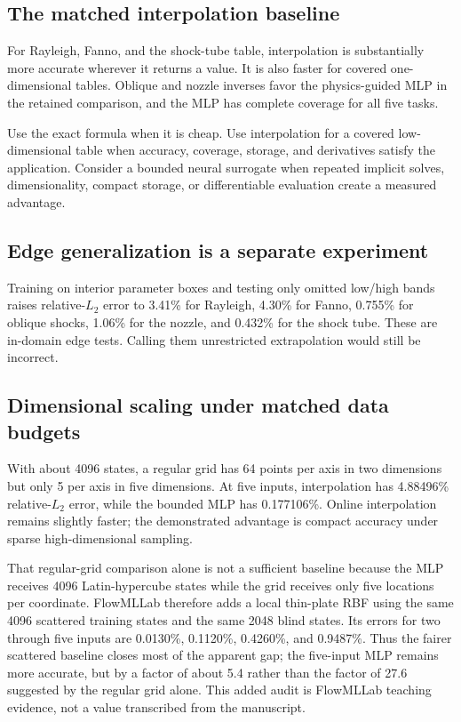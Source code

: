 \documentclass[11pt]{article}
\begin{document}
\subsection{The matched interpolation baseline}
For Rayleigh, Fanno, and the shock-tube table, interpolation is substantially
more accurate wherever it returns a value. It is also faster for covered
one-dimensional tables. Oblique and nozzle inverses favor the physics-guided MLP
in the retained comparison, and the MLP has complete coverage for all five tasks.

\begin{decisionbox}
Use the exact formula when it is cheap. Use interpolation for a covered
low-dimensional table when accuracy, coverage, storage, and derivatives satisfy
the application. Consider a bounded neural surrogate when repeated implicit
solves, dimensionality, compact storage, or differentiable evaluation create a
measured advantage.
\end{decisionbox}

\subsection{Edge generalization is a separate experiment}
Training on interior parameter boxes and testing only omitted low/high bands
raises relative-$L_2$ error to 3.41\% for Rayleigh, 4.30\% for Fanno, 0.755\%
for oblique shocks, 1.06\% for the nozzle, and 0.432\% for the shock tube. These
are in-domain edge tests. Calling them unrestricted extrapolation would still be incorrect.

\subsection{Dimensional scaling under matched data budgets}
With about 4096 states, a regular grid has 64 points per axis in two dimensions
but only 5 per axis in five dimensions. At five inputs, interpolation has
4.88496\% relative-$L_2$ error, while the bounded MLP has 0.177106\%. Online
interpolation remains slightly faster; the demonstrated advantage is compact
accuracy under sparse high-dimensional sampling.

That regular-grid comparison alone is not a sufficient baseline because the
MLP receives 4096 Latin-hypercube states while the grid receives only five
locations per coordinate. FlowMLLab therefore adds a local thin-plate RBF using
the same 4096 scattered training states and the same 2048 blind states. Its
errors for two through five inputs are 0.0130\%, 0.1120\%, 0.4260\%, and
0.9487\%. Thus the fairer scattered baseline closes most of the apparent gap;
the five-input MLP remains more accurate, but by a factor of about 5.4 rather
than the factor of 27.6 suggested by the regular grid alone. This added audit
is FlowMLLab teaching evidence, not a value transcribed from the manuscript.
\end{document}
